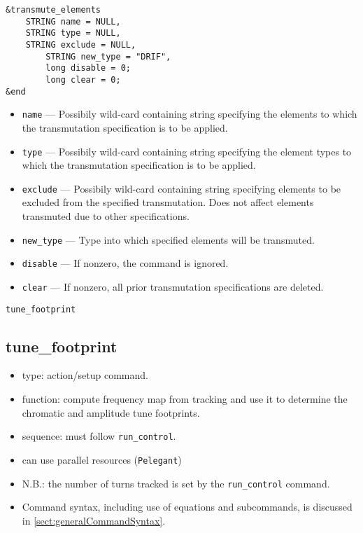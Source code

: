 \documentclass[11pt]{article}
\begin{document}
\begin{verbatim}
&transmute_elements
	STRING name = NULL,
	STRING type = NULL,
	STRING exclude = NULL,
        STRING new_type = "DRIF",
        long disable = 0;
        long clear = 0;
&end
\end{verbatim}

\begin{itemize}
\item \verb|name| --- Possibily wild-card containing string specifying the
	elements to which the transmutation specification is to be applied.
\item \verb|type| --- Possibily wild-card containing string specifying the
	element types to which the transmutation specification is to be applied.
\item \verb|exclude| --- Possibily wild-card containing string specifying 
	elements to be excluded from the specified transmutation.  Does not
	affect elements transmuted due to other specifications.
\item \verb|new_type| --- Type into which specified elements will be transmuted.
\item \verb|disable| --- If nonzero, the command is ignored.
\item \verb|clear| --- If nonzero, all prior transmutation specifications are deleted.
\end{itemize}

\newpage
\begin{center}{\Large\verb|tune_footprint|}\end{center}
\subsection{tune\_footprint \label{subsec:tunefootprint}}

\begin{itemize}
\item type: action/setup command.  
\item function: compute frequency map from tracking and use it to determine the 
  chromatic and amplitude tune footprints.
\item sequence: must follow \verb|run_control|.
\item can use parallel resources (\verb|Pelegant|)
\item N.B.: the number of turns tracked is set by the \verb|run_control| command.
\item Command syntax, including use of equations and subcommands, is discussed in \ref{sect:generalCommandSyntax}.
\end{itemize}
\end{document}
